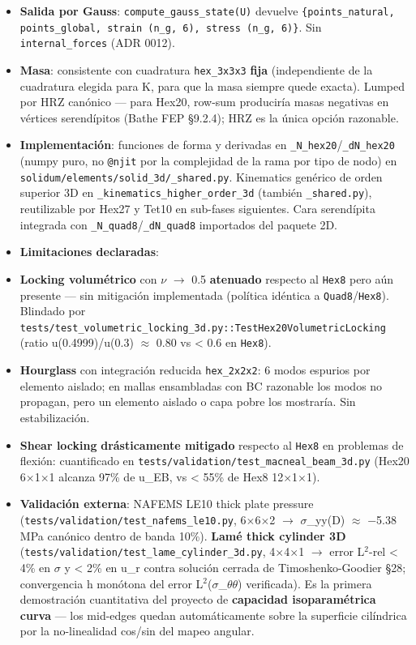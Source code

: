 \documentclass[11pt,letterpaper,oneside]{report}
\begin{document}
\begin{itemize}
  \item \textbf{Salida por Gauss}: \texttt{compute\_gauss\_state(U)} devuelve \texttt{\{points\_natural, points\_global, strain (n\_g, 6), stress (n\_g, 6)\}}. Sin \texttt{internal\_forces} (ADR 0012).
  \item \textbf{Masa}: consistente con cuadratura \texttt{hex\_3x3x3} \textbf{fija} (independiente de la cuadratura elegida para K, para que la masa siempre quede exacta). Lumped por HRZ canónico --- para Hex20, row-sum produciría masas negativas en vértices serendípitos (Bathe FEP §9.2.4); HRZ es la única opción razonable.
  \item \textbf{Implementación}: funciones de forma y derivadas en \texttt{\_N\_hex20}/\texttt{\_dN\_hex20} (numpy puro, no \texttt{@njit} por la complejidad de la rama por tipo de nodo) en \texttt{solidum/elements/solid\_3d/\_shared.py}. Kinematics genérico de orden superior 3D en \texttt{\_kinematics\_higher\_order\_3d} (también \texttt{\_shared.py}), reutilizable por Hex27 y Tet10 en sub-fases siguientes. Cara serendípita integrada con \texttt{\_N\_quad8}/\texttt{\_dN\_quad8} importados del paquete 2D.
  \item \textbf{Limitaciones declaradas}:
  \item \textbf{Locking volumétrico} con \ensuremath{\nu} \ensuremath{\to} 0.5 \textbf{atenuado} respecto al \texttt{Hex8} pero aún presente --- sin mitigación implementada (política idéntica a \texttt{Quad8}/\texttt{Hex8}). Blindado por \texttt{tests/test\_volumetric\_locking\_3d.py::TestHex20VolumetricLocking} (ratio u(0.4999)/u(0.3) \ensuremath{\approx} 0.80 vs < 0.6 en \texttt{Hex8}).
  \item \textbf{Hourglass} con integración reducida \texttt{hex\_2x2x2}: 6 modos espurios por elemento aislado; en mallas ensambladas con BC razonable los modos no propagan, pero un elemento aislado o capa pobre los mostraría. Sin estabilización.
  \item \textbf{Shear locking} \textbf{drásticamente mitigado} respecto al \texttt{Hex8} en problemas de flexión: cuantificado en \texttt{tests/validation/test\_macneal\_beam\_3d.py} (Hex20 6\ensuremath{\times}1\ensuremath{\times}1 alcanza 97\% de u\_EB, vs < 55\% de Hex8 12\ensuremath{\times}1\ensuremath{\times}1).
  \item \textbf{Validación externa}: NAFEMS LE10 thick plate pressure (\texttt{tests/validation/test\_nafems\_le10.py}, 6\ensuremath{\times}6\ensuremath{\times}2 \ensuremath{\to} \ensuremath{\sigma}\_yy(D) \ensuremath{\approx} −5.38 MPa canónico dentro de banda 10\%). \textbf{Lamé thick cylinder 3D} (\texttt{tests/validation/test\_lame\_cylinder\_3d.py}, 4\ensuremath{\times}4\ensuremath{\times}1 \ensuremath{\to} error L\ensuremath{^{2}}-rel < 4\% en \ensuremath{\sigma} y < 2\% en u\_r contra solución cerrada de Timoshenko-Goodier §28; convergencia h monótona del error L\ensuremath{^{2}}(\ensuremath{\sigma}\_\ensuremath{\theta}\ensuremath{\theta}) verificada). Es la primera demostración cuantitativa del proyecto de \textbf{capacidad isoparamétrica curva} --- los mid-edges quedan automáticamente sobre la superficie cilíndrica por la no-linealidad cos/sin del mapeo angular.

\end{itemize}
\end{document}
